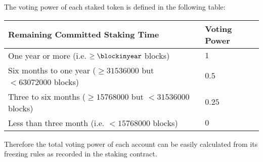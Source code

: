 The voting power of each staked token is defined in the following table:

\par
\begin{center}
\begin{tabular}{ll}
\toprule
Remaining Committed Staking Time & Voting Power \\
\midrule
One year or more (i.e. $\ge \blockinyear$ blocks) & $1$  \\
Six months to one year ($\ge 31536000$ but $<63072000$ blocks) & $0.5$ \\
Three to six months ($\ge 15768000$ but $<31536000$ blocks) & $0.25$\\
Less than three month (i.e. $< 15768000$ blocks) & $0$ \\
\bottomrule
\end{tabular}
\end{center}
\par
Therefore the total voting power of each account can be easily calculated from its freezing rules as recorded in the staking contract.
